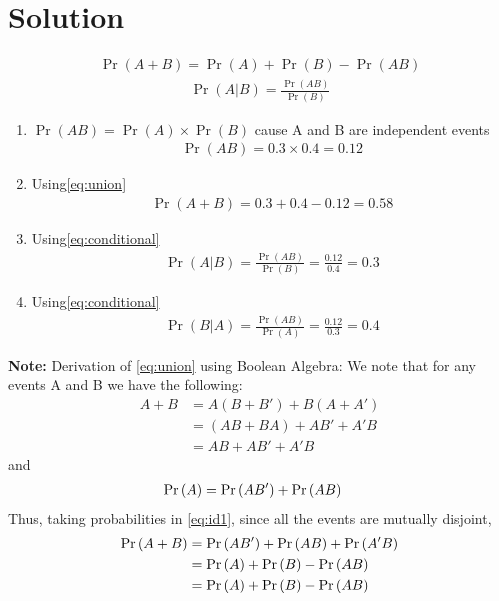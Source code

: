 \documentclass[journal,12pt,twocolumn]{IEEEtran}
\begin{document}
\section{Solution}
\solution{}
\begin{align}
    \Pr(A+B) = \Pr(A) + \Pr(B) - \Pr(AB)
    \label{eq:union}
\end{align}
\begin{align}
    \Pr(A|B) = \frac{\Pr(AB)}{\Pr(B)}
    \label{eq:conditional}
\end{align}
\begin{enumerate}[label= (\roman{enumi})]
    \item $\Pr(AB) = \Pr(A) \times \Pr(B)$ cause A and B are independent events\\
    \begin{align}
        \Pr(AB) = 0.3 \times 0.4 = 0.12
    \end{align}
    \item Using\eqref{eq:union}\\
    \begin{align}
        \Pr(A+B) = 0.3 + 0.4 - 0.12 = 0.58
    \end{align}
    \item Using\eqref{eq:conditional}\\
    \begin{align}
        \Pr(A|B) = \frac{\Pr(AB)}{\Pr(B)} = \frac{0.12}{0.4} = 0.3
    \end{align}
    \item Using\eqref{eq:conditional}\\
    \begin{align}
        \Pr(B|A) = \frac{\Pr(AB)}{\Pr(A)} = \frac{0.12}{0.3} = 0.4
    \end{align}
\end{enumerate}
\noindent \textbf{Note:} Derivation of \eqref{eq:union} using Boolean Algebra:
\noindent We note that for any events A and B we have the following:
\begin{align}
A + B &= A(B + B') + B(A + A') \\ 
&= (AB + BA) + AB' + A'B \\
&= AB + AB' + A'B
\label{eq:id1}
\end{align}
and
\begin{align}
\Pr\left(A\right) &= \Pr\left(AB'\right) + \Pr\left(AB\right) 
\label{eq:id2}
\end{align}
Thus, taking probabilities in \eqref{eq:id1}, since all the events are mutually disjoint,
\begin{align}
\Pr\left(A + B\right) &= \Pr\left(AB'\right) + \Pr\left(AB\right) + \Pr\left(A'B\right) \\
&= \Pr\left(A\right) + \Pr\left(B\right) - \Pr\left(AB\right) \\
&= \Pr\left(A\right) + \Pr\left(B\right) - \Pr\left(AB\right)
\label{eq:derive}
\end{align}
\end{document}
